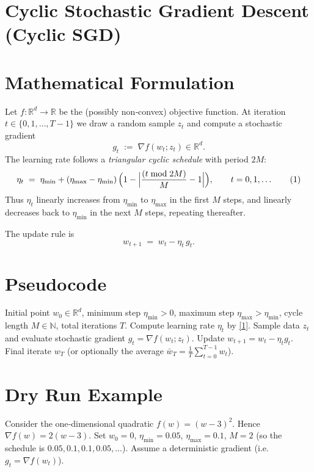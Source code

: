 \documentclass{article}
\newcommand{\RR}{\mathbb{R}}
\begin{document}
\section*{Cyclic Stochastic Gradient Descent (Cyclic SGD)}

\section*{Mathematical Formulation}
Let $f:\RR^{d}\rightarrow\RR$ be the (possibly non‑convex) objective function.  
At iteration $t\in\{0,1,\dots,T-1\}$ we draw a random sample $z_t$ and compute a stochastic gradient
\[
g_t \;:=\; \nabla f(w_t;z_t)\in\RR^{d}.
\]
The learning rate follows a \emph{triangular cyclic schedule} with period $2M$:
\[
\eta_t \;=\; \eta_{\min}+(\eta_{\max}-\eta_{\min})\,
\Bigl(1-\Bigl|\frac{(t\bmod 2M)}{M}-1\Bigr|\Bigr),\qquad
t=0,1,\dots
\tag{1}
\]
Thus $\eta_t$ linearly increases from $\eta_{\min}$ to $\eta_{\max}$ in the first $M$ steps,
and linearly decreases back to $\eta_{\min}$ in the next $M$ steps, repeating thereafter.

The update rule is
\[
w_{t+1}\;=\;w_t-\eta_t\,g_t .
\tag{2}
\]

\section*{Pseudocode}
\begin{algorithm}[H]
\caption{Cyclic SGD}
\begin{algorithmic}[1]
\REQUIRE Initial point $w_0\in\RR^{d}$, 
          minimum step $\eta_{\min}>0$, 
          maximum step $\eta_{\max}> \eta_{\min}$,
          cycle length $M\in\mathbb{N}$,
          total iterations $T$.
    \STATE Compute learning rate $\eta_t$ by \eqref{1}.
    \STATE Sample data $z_t$ and evaluate stochastic gradient $g_t=\nabla f(w_t;z_t)$.
    \STATE Update $w_{t+1}=w_t-\eta_t g_t$.
\ENDFOR
\ENSURE Final iterate $w_T$ (or optionally the average $\bar w_T=\frac1T\sum_{t=0}^{T-1}w_t$).
\end{algorithmic}
\end{algorithm}

\section*{Dry Run Example}
Consider the one‑dimensional quadratic $f(w)=(w-3)^2$.
Hence $\nabla f(w)=2(w-3)$.  
Set $w_0=0$, $\eta_{\min}=0.05$, $\eta_{\max}=0.1$, $M=2$ (so the schedule is $0.05,0.1,0.1,0.05,\dots$).  
Assume a deterministic gradient (i.e. $g_t=\nabla f(w_t)$).
\end{document}
